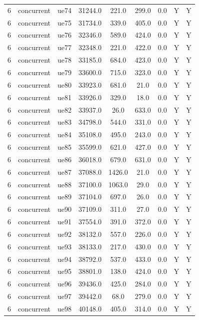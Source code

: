 \begin{table}[ht]
\begin{tabular}{|c|c|c|c|c|c|c|c|c|}
6 & concurrent & ue74 & 31244.0 & 221.0 & 299.0 & 0.0 & Y & Y \\
6 & concurrent & ue75 & 31734.0 & 339.0 & 405.0 & 0.0 & Y & Y \\
6 & concurrent & ue76 & 32346.0 & 589.0 & 424.0 & 0.0 & Y & Y \\
6 & concurrent & ue77 & 32348.0 & 221.0 & 422.0 & 0.0 & Y & Y \\
6 & concurrent & ue78 & 33185.0 & 684.0 & 423.0 & 0.0 & Y & Y \\
6 & concurrent & ue79 & 33600.0 & 715.0 & 323.0 & 0.0 & Y & Y \\
6 & concurrent & ue80 & 33923.0 & 681.0 & 21.0 & 0.0 & Y & Y \\
6 & concurrent & ue81 & 33926.0 & 329.0 & 18.0 & 0.0 & Y & Y \\
6 & concurrent & ue82 & 33937.0 & 26.0 & 633.0 & 0.0 & Y & Y \\
6 & concurrent & ue83 & 34798.0 & 544.0 & 331.0 & 0.0 & Y & Y \\
6 & concurrent & ue84 & 35108.0 & 495.0 & 243.0 & 0.0 & Y & Y \\
6 & concurrent & ue85 & 35599.0 & 621.0 & 427.0 & 0.0 & Y & Y \\
6 & concurrent & ue86 & 36018.0 & 679.0 & 631.0 & 0.0 & Y & Y \\
6 & concurrent & ue87 & 37088.0 & 1426.0 & 21.0 & 0.0 & Y & Y \\
6 & concurrent & ue88 & 37100.0 & 1063.0 & 29.0 & 0.0 & Y & Y \\
6 & concurrent & ue89 & 37104.0 & 697.0 & 26.0 & 0.0 & Y & Y \\
6 & concurrent & ue90 & 37109.0 & 311.0 & 27.0 & 0.0 & Y & Y \\
6 & concurrent & ue91 & 37554.0 & 391.0 & 372.0 & 0.0 & Y & Y \\
6 & concurrent & ue92 & 38132.0 & 557.0 & 226.0 & 0.0 & Y & Y \\
6 & concurrent & ue93 & 38133.0 & 217.0 & 430.0 & 0.0 & Y & Y \\
6 & concurrent & ue94 & 38792.0 & 537.0 & 433.0 & 0.0 & Y & Y \\
6 & concurrent & ue95 & 38801.0 & 138.0 & 424.0 & 0.0 & Y & Y \\
6 & concurrent & ue96 & 39436.0 & 425.0 & 284.0 & 0.0 & Y & Y \\
6 & concurrent & ue97 & 39442.0 & 68.0 & 279.0 & 0.0 & Y & Y \\
6 & concurrent & ue98 & 40148.0 & 405.0 & 314.0 & 0.0 & Y & Y \\

\end{tabular}
\end{table}
